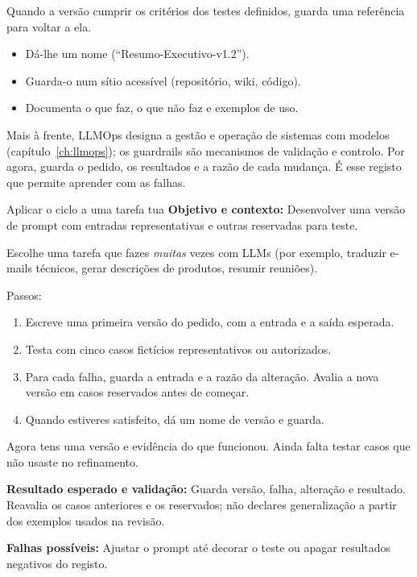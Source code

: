 Quando a versão cumprir os critérios dos testes definidos, guarda uma referência para voltar a ela.

\begin{itemize}[leftmargin=*]
\item Dá-lhe um nome (“Resumo-Executivo-v1.2”).
\item Guarda-o num sítio acessível (repositório, wiki, código).
\item Documenta o que faz, o que não faz e exemplos de uso.
\end{itemize}

Mais à frente, LLMOps designa a gestão e operação de sistemas com modelos (capítulo~\ref{ch:llmops}); os guardrails são mecanismos de validação e controlo. Por agora, guarda o pedido, os resultados e a razão de cada mudança. É esse registo que permite aprender com as falhas.

\begin{promptlabbox}{Aplicar o ciclo a uma tarefa tua}
\textbf{Objetivo e contexto:} Desenvolver uma versão de prompt com entradas representativas e outras reservadas para teste.

Escolhe uma tarefa que fazes \emph{muitas} vezes com LLMs (por exemplo, traduzir e-mails técnicos, gerar descrições de produtos, resumir reuniões).

\medskip

Passos:

\begin{enumerate}[leftmargin=*]
\item Escreve uma primeira versão do pedido, com a entrada e a saída esperada.
\item Testa com cinco casos fictícios representativos ou autorizados.
\item Para cada falha, guarda a entrada e a razão da alteração. Avalia a nova versão em casos reservados antes de começar.
\item Quando estiveres satisfeito, dá um nome de versão e guarda.
\end{enumerate}

Agora tens uma versão e evidência do que funcionou. Ainda falta testar casos que não usaste no refinamento.

\textbf{Resultado esperado e validação:} Guarda versão, falha, alteração e resultado. Reavalia os casos anteriores e os reservados; não declares generalização a partir dos exemplos usados na revisão.

\textbf{Falhas possíveis:} Ajustar o prompt até decorar o teste ou apagar resultados negativos do registo.
\end{promptlabbox}


